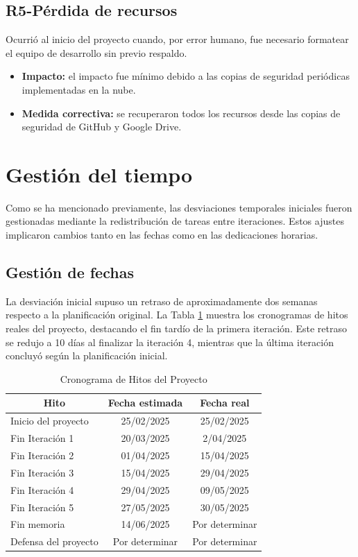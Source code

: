   \subsection{R5-Pérdida de recursos}
  Ocurrió al inicio del proyecto cuando, por error humano, fue necesario formatear el equipo de desarrollo sin previo respaldo.
  \begin{itemize}
  \item\textbf{Impacto: }el impacto fue mínimo debido a las copias de seguridad periódicas implementadas en la nube.
\item\textbf{Medida correctiva: }se recuperaron todos los recursos desde las copias de seguridad de GitHub y Google Drive.
\end{itemize}

\section{Gestión del tiempo}
Como se ha mencionado previamente, las desviaciones temporales iniciales fueron gestionadas mediante la redistribución de tareas entre iteraciones. Estos ajustes implicaron cambios tanto en las fechas como en las dedicaciones horarias.

\subsection{Gestión de fechas}
La desviación inicial supuso un retraso de aproximadamente dos semanas respecto a la planificación original. La Tabla \ref{tab:hitos_real} muestra los cronogramas de hitos reales del proyecto, destacando el fin tardío de la primera iteración. Este retraso se redujo a 10 días al finalizar la iteración 4, mientras que la última iteración concluyó según la planificación inicial.

\begin{table}[H]\centering
\begin{tabular}{|l|c|c|}
\hline
\multicolumn{1}{|c|}{\textbf{Hito}} & \multicolumn{1}{c|}{\textbf{Fecha estimada}} & \multicolumn{1}{c|}{\textbf{Fecha real}} \\
\hline
Inicio del proyecto & 25/02/2025 & 25/02/2025 \\
\hline
Fin Iteración 1 & 20/03/2025 & 2/04/2025 \\
\hline
Fin Iteración 2 & 01/04/2025 & 15/04/2025 \\
\hline
Fin Iteración 3 & 15/04/2025 & 29/04/2025 \\
\hline
Fin Iteración 4 & 29/04/2025 & 09/05/2025 \\
\hline
Fin Iteración 5 & 27/05/2025 & 30/05/2025 \\
\hline
Fin memoria & 14/06/2025 & Por determinar \\
\hline
Defensa del proyecto & Por determinar & Por determinar \\
\hline
\end{tabular}
\caption{Cronograma de Hitos del Proyecto}
\label{tab:hitos_real}
\end{table}

